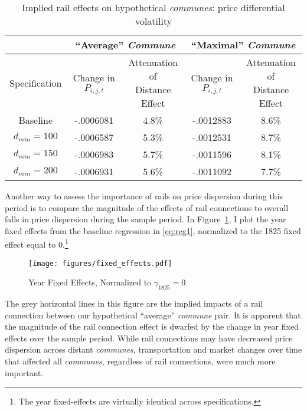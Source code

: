 \documentclass[12pt,twoside]{article}
\begin{document}
\begin{table}[ht]
	\centering \caption{Implied rail effects on hypothetical \emph{communes}: price differential volatility} \label{tab:treatment2}
	\begin{centering}
	\begin{tabular}{ |c|c|c|c|c| }
		\hline & \multicolumn{2}{c|}{``Average'' \emph{Commune}} & \multicolumn{2}{c|}{``Maximal'' \emph{Commune}} \\ \hline
		Specification & \shortstack{Change in \\ $P_{i,j,t}$} & \shortstack{Attenuation of \\ Distance Effect} & \shortstack{Change in \\ $P_{i,j,t}$} & \shortstack{Attenuation of \\ Distance Effect} \\ \hline
		Baseline & -.0006081 & 4.8\% & -.0012883 & 8.6\% \\
		$d_{min} = 100$ & -.0006587 & 5.3\% & -.0012531 & 8.7\% \\
		$d_{min} = 150$ & -.0006983 & 5.7\% & -.0011596 & 8.1\% \\
		$d_{min} = 200$ & -.0006931 & 5.6\% & -.0011092 & 7.7\% \\ \hline
	\end{tabular}
	\end{centering}
\end{table}

Another way to assess the importance of rails on price dispersion during this period is to compare the magnitude of the effects of rail connections to overall falls in price dispersion during the sample period.
In Figure~\ref{fig:fixed_effects}, I plot the year fixed effects from the baseline regression in \eqref{eq:reg1}, normalized to the 1825 fixed effect equal to 0.\footnote{The year fixed-effects are virtually identical across specifications.}

\begin{figure}[ht]
	\centering
	\caption{Year Fixed Effects, Normalized to $\gamma_{1825} = 0$}
	\texttt{[image: figures/fixed\_effects.pdf]}
	\label{fig:fixed_effects}
\end{figure}

The grey horizontal lines in this figure are the implied impacts of a rail connection between our hypothetical ``average'' \emph{commune} pair.
It is apparent that the magnitude of the rail connection effect is dwarfed by the change in year fixed effects over the sample period.
While rail connections may have decreased price dispersion across distant \emph{communes}, transportation and market changes over time that affected all \emph{communes}, regardless of rail connections, were much more important.
\end{document}
